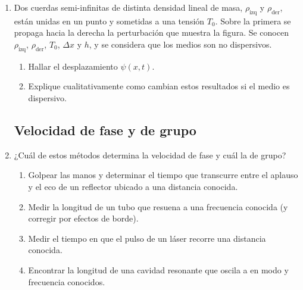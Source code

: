 \documentclass[11pt,spanish,a4paper]{article}
\begin{document}
\begin{enumerate}
\item 
\begin{minipage}[t][2.1cm]{0.6\textwidth}
Dos cuerdas semi-infinitas de distinta densidad lineal de masa, $\rho_\text{izq}$ y $\rho_\text{der}$, están unidas en un punto y sometidas a una tensión $T_0$.
Sobre la primera se propaga hacia la derecha la perturbación que muestra la figura.
Se conocen $\rho_\text{izq}$, $\rho_\text{der}$, $T_0$, $\Delta x$ y $h$, y se considera que los medios son no dispersivos.
\end{minipage}
\begin{minipage}[c][0.4cm][t]{0.34\textwidth}
\end{minipage}
\begin{enumerate}
	\item Hallar el desplazamiento $\psi(x,t)$.
	\item Explique cualitativamente como cambian estos resultados si el medio es dispersivo.
\end{enumerate}




\subsection*{Velocidad de fase y de grupo}

\item ¿Cuál de estos métodos determina la velocidad de fase y cuál la de grupo?
\begin{enumerate}
\item Golpear las manos y determinar el tiempo que transcurre entre el aplauso y el eco de un reflector ubicado a una distancia conocida.
\item Medir la longitud de un tubo que resuena a una frecuencia conocida (y corregir por efectos de borde).
\item Medir el tiempo en que el pulso de un láser recorre una distancia conocida.
\item Encontrar la longitud de una cavidad resonante que oscila a en modo y frecuencia conocidos.
\end{enumerate}



\end{enumerate}
\end{document}
